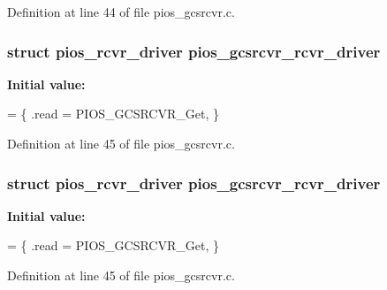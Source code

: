 Definition at line 44 of file pios\-\_\-gcsrcvr.\-c.

\hypertarget{group___p_i_o_s___g_c_s_r_c_v_r_ga6405e16bd59aa95205a0d825e3f0b31d}{
\subsubsection[{pios\-\_\-gcsrcvr\-\_\-rcvr\-\_\-driver}]{\setlength{\rightskip}{0pt plus 5cm}struct {\bf pios\-\_\-rcvr\-\_\-driver} pios\-\_\-gcsrcvr\-\_\-rcvr\-\_\-driver}}\label{group___p_i_o_s___g_c_s_r_c_v_r_ga6405e16bd59aa95205a0d825e3f0b31d}
{\bfseries Initial value\-:}
\begin{DoxyCode}
= \{
        .read = PIOS\_GCSRCVR\_Get,
\}
\end{DoxyCode}


Definition at line 45 of file pios\-\_\-gcsrcvr.\-c.

\hypertarget{group___p_i_o_s___g_c_s_r_c_v_r_ga6405e16bd59aa95205a0d825e3f0b31d}{
\subsubsection[{pios\-\_\-gcsrcvr\-\_\-rcvr\-\_\-driver}]{\setlength{\rightskip}{0pt plus 5cm}struct {\bf pios\-\_\-rcvr\-\_\-driver} pios\-\_\-gcsrcvr\-\_\-rcvr\-\_\-driver}}\label{group___p_i_o_s___g_c_s_r_c_v_r_ga6405e16bd59aa95205a0d825e3f0b31d}
{\bfseries Initial value\-:}
\begin{DoxyCode}
= \{
        .read = PIOS\_GCSRCVR\_Get,
\}
\end{DoxyCode}


Definition at line 45 of file pios\-\_\-gcsrcvr.\-c.

